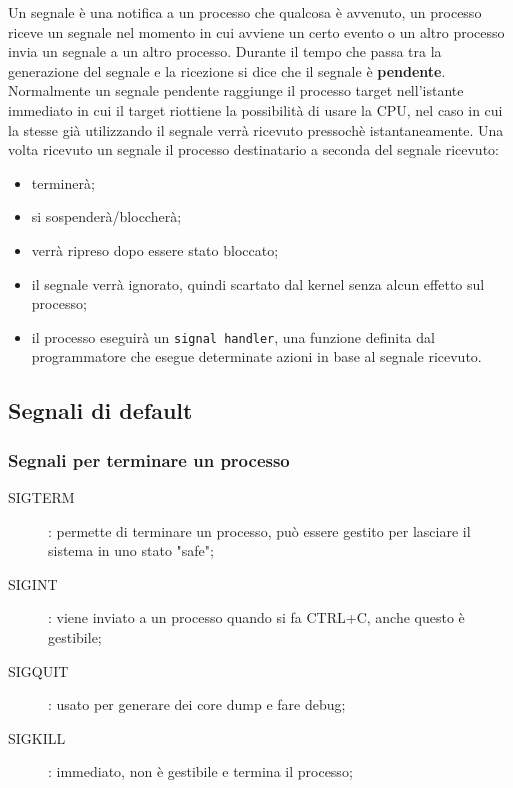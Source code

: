 \documentclass[a4paper, 12pt]{book}
\begin{document}
    Un segnale è una notifica a un processo che qualcosa 
    è avvenuto, un processo riceve un segnale nel momento 
    in cui avviene un certo evento o un altro processo 
    invia un segnale a un altro processo. Durante il tempo 
    che passa tra la generazione del segnale e la ricezione
    si dice che il segnale è \textbf{pendente}. Normalmente 
    un segnale pendente raggiunge il processo target nell'istante 
    immediato in cui il target riottiene la possibilità 
    di usare la CPU, nel caso in cui la stesse già utilizzando 
    il segnale verrà ricevuto pressochè istantaneamente.
    Una volta ricevuto un segnale il processo destinatario 
    a seconda del segnale ricevuto:
    \begin{itemize}
        \item terminerà;
        \item si sospenderà/bloccherà;
        \item verrà ripreso dopo essere stato bloccato;
        \item il segnale verrà ignorato, quindi scartato dal kernel senza alcun effetto sul processo;
        \item il processo eseguirà un \verb|signal handler|, una funzione definita dal programmatore che esegue determinate azioni in base al segnale ricevuto.
    \end{itemize} 

    \subsection{Segnali di default}

    \subsubsection{Segnali per terminare un processo}

    \begin{description}
        \item[SIGTERM]: permette di terminare un processo, può essere gestito per lasciare il sistema in uno stato "safe";
        \item[SIGINT]: viene inviato a un processo quando si fa CTRL+C, anche questo è gestibile;
        \item[SIGQUIT]: usato per generare dei core dump e fare debug;
        \item[SIGKILL]: immediato, non è gestibile e termina il processo; 
    \end{description}
\end{document}
